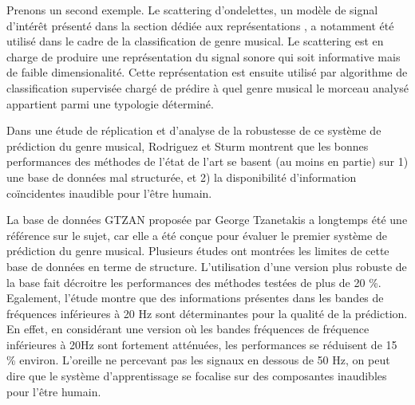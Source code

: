   Prenons un second exemple. Le scattering d'ondelettes, un modèle de signal d'intérêt présenté dans la section dédiée aux représentations , a notamment été utilisé dans le cadre de la classification de genre musical\cite{anden2014deep}. Le scattering est en charge de produire une représentation du signal sonore qui soit informative mais de faible dimensionalité. Cette représentation est ensuite utilisé par algorithme de classification supervisée chargé de prédire à quel genre musical le morceau analysé appartient parmi une typologie déterminé.

  Dans une étude de réplication et d'analyse de la robustesse de ce système de prédiction du genre musical\cite{rodriguez2016analysing}, Rodriguez et Sturm montrent que les bonnes performances des méthodes de l'état de l'art se basent (au moins en partie) sur 1) une base de données mal structurée, et 2) la disponibilité d'information coïncidentes inaudible pour l'être humain.

  La base de données GTZAN proposée par George Tzanetakis a longtemps été une référence sur le sujet, car elle a été conçue pour évaluer le premier système de prédiction du genre musical\cite{tzanetakis2002musical}. Plusieurs études ont montrées les limites de cette base de données en terme de structure. L'utilisation d'une version plus robuste de la base fait décroitre les performances des méthodes testées de plus de 20 \%. Egalement, l'étude montre que des informations présentes dans les bandes de fréquences inférieures à 20 Hz sont déterminantes pour la qualité de la prédiction. En effet, en considérant une version où les bandes fréquences de fréquence inférieures à 20Hz sont fortement atténuées, les performances se réduisent de 15 \% environ. L'oreille ne percevant pas les signaux en dessous de 50 Hz, on peut dire que le système d'apprentissage se focalise sur des composantes inaudibles pour l'être humain.

